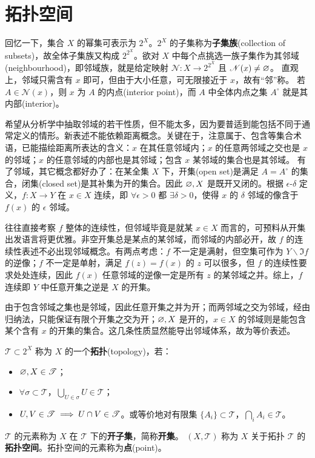 \section{拓扑空间}

回忆一下，集合 $X$ 的幂集可表示为 $2^X$。$2^X$ 的子集称为\textbf{子集族}(collection of subsets)，故全体子集族又构成 $2^{2^X}$。欲对 $X$ 中每个点挑选⼀族⼦集作为其邻域(neighbourhood)，即邻域族，就是给定映射 $\mathscr N:X\to 2^{2^X}$ 且 $\mathscr N(x)\ne \varnothing$。
直观上，邻域只需含有 $x$ 即可，但由于大小任意，可无限接近于 $x$，故有“邻”称。
若 $A\in \mathscr N(x)$，则 $x$ 为 $A$ 的内点(interior point)，而 $A$ 中全体内点之集 $A^\circ$ 就是其内部(interior)。

希望从分析学中抽取邻域的若干性质，但不能太多，因为要普适到能包括不同于通常定义的情形。新表述不能依赖距离概念。关键在于，注意属于、包含等集合术语，已能描绘距离所表达的含义：$x$ 在其任意邻域内；$x$ 的任意两邻域之交也是 $x$ 的邻域；$x$ 的任意邻域的内部也是其邻域；包含 $x$ 某邻域的集合也是其邻域。
有了邻域，其它概念都好办了：在某全集 $X$ 下，开集(open set)是满足 $A=A^\circ$ 的集合，闭集(closed set)是其补集为开的集合。因此 $\varnothing,X$ 是既开又闭的。根据 $\epsilon$-$\delta$ 定义，$f:X\to Y$ 在 $x\in X$ 连续，即 $\forall\epsilon>0$ 都 $\exists\delta>0$，使得 $x$ 的 $\delta$ 邻域的像含于 $f(x)$ 的 $\epsilon$ 邻域。

往往直接考察 $f$ 整体的连续性，但邻域毕竟是就某 $x\in X$ 而言的，可预料从开集出发语言将更优雅。非空开集总是某点的某邻域，而邻域的内部必开，故 $f$ 的连续性表述不必出现邻域概念。有两点考虑：$f$ 不一定是满射，但空集可作为 $Y\backslash\Im f$ 的逆像；$f$ 不一定是单射，满足 $f(z)=f(x)$ 的 $z$ 可以很多，但 $f$ 的连续性要求处处连续，因此 $f(x)$ 任意邻域的逆像一定是所有 $z$ 的某邻域之并。综上，$f$ 连续即 $Y$ 中任意开集之逆是 $X$ 的开集。

由于包含邻域之集也是邻域，因此任意开集之并为开；而两邻域之交为邻域，经由归纳法，只能保证有限个开集之交为开；$\varnothing,X$ 是开的，$x\in X$ 的邻域则是能包含某个含有 $x$ 的开集的集合。这几条性质显然能导出邻域体系，故为等价表述。

\begin{definition}
$\mathscr{T}\subset 2^X$ 称为 $X$ 的一个\textbf{拓扑}(topology)，若：
\begin{itemize}
    \item $\varnothing,X \in \mathscr{T}$；
    \item $\forall \sigma\subset \mathscr{T}$，$\bigcup_{U\in\sigma} U\in \mathscr{T}$；
    \item $U,V\in\mathscr{T}\implies U\cap V\in\mathscr{T}$。或等价地对有限集 $\{A_{i}\} \subset \mathscr{T}$，$\bigcap_{i} A_{i} \in \mathscr{T}$。
\end{itemize}
$\mathscr{T}$ 的元素称为 $X$ 在 $\mathscr{T}$ 下的\textbf{开子集}，简称\textbf{开集}。
$(X,\mathscr T)$ 称为 $X$ 关于拓扑 $\mathscr T$ 的\textbf{拓扑空间}。拓扑空间的元素称为\textbf{点}(point)。
\end{definition}

